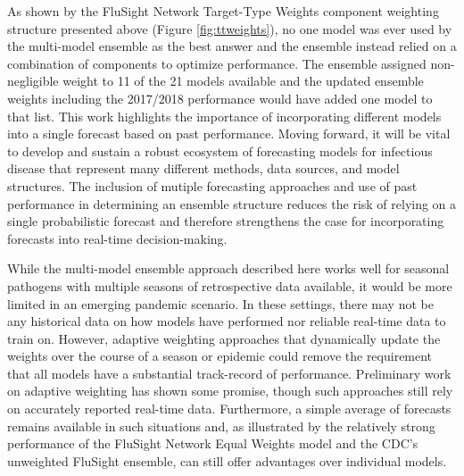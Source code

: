 \documentclass{article}\usepackage[]{graphicx}\usepackage[]{color}
\begin{document}
As shown by the FluSight Network Target-Type Weights component weighting structure presented above (Figure \ref{fig:ttweights}), no one model was ever used by the multi-model ensemble as the best answer and the ensemble instead relied on a combination of components to optimize performance. 
The ensemble assigned non-negligible weight to 11 of the 21 models available and the updated ensemble weights including the 2017/2018 performance would have added one model to that list. 
This work highlights the importance of incorporating different models into a single forecast based on past performance.
Moving forward, it will be vital to develop and sustain a robust ecosystem of forecasting models for infectious disease that represent many different methods, data sources, and model structures.
The inclusion of mutiple forecasting approaches and use of past performance in determining an ensemble structure reduces the risk of relying on a single probabilistic forecast and therefore strengthens the case for incorporating forecasts into real-time decision-making.



While the multi-model ensemble approach described here works well for seasonal pathogens with multiple seasons of retrospective data available, it would be more limited in an emerging pandemic scenario.
In these settings, there may not be any historical data on how models have performed nor reliable real-time data to train on.
However, adaptive weighting approaches that dynamically update the weights over the course of a season or epidemic could remove the requirement that all models have a substantial track-record of performance. 
Preliminary work on adaptive weighting has shown some promise, though such approaches still rely on accurately reported real-time data.
Furthermore, a simple average of forecasts remains available in such situations and, as illustrated by the relatively strong performance of the FluSight Network Equal Weights model and the CDC's unweighted FluSight ensemble, can still offer advantages over individual models.
\end{document}
